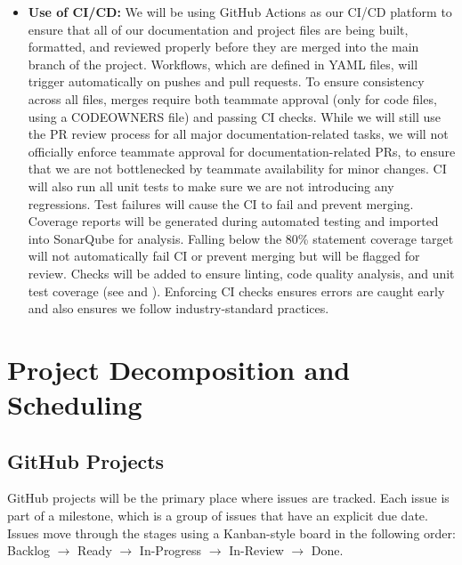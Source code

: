 \documentclass{article}
\begin{document}
\begin{itemize}
    \item \textbf{Use of CI/CD:} We will be using GitHub Actions as our CI/CD platform to ensure that all of our documentation and project files are being built,
          formatted, and reviewed properly before they are merged into the main branch of the project. Workflows, which are defined in
          YAML files, will trigger automatically on pushes and pull requests. To ensure consistency across
          all files, merges require both teammate approval (only for code files, using a CODEOWNERS file) and passing CI checks.
          While we will still use the PR review process for all major documentation-related tasks, we will not officially enforce teammate approval for documentation-related PRs, to ensure that we are not bottlenecked by teammate availability for minor changes.
          CI will also run all unit tests to make sure we are not introducing any regressions.
          Test failures will cause the CI to fail and prevent merging.
          Coverage reports will be generated during automated testing and imported into SonarQube for analysis.
          Falling below the 80\% statement coverage target will not automatically fail CI or prevent merging but will be flagged for review.
          Checks will be added to ensure linting, code quality analysis, and unit test coverage (see  and ).
          Enforcing CI checks ensures errors are caught early and also ensures we follow industry-standard practices.

\end{itemize}

\section{Project Decomposition and Scheduling}


\subsection*{GitHub Projects}

GitHub projects will be the primary place where issues are tracked. Each issue
is part of a milestone, which is a group of issues that have an explicit due
date. Issues move through the stages using a Kanban-style board in the
following order: Backlog $\rightarrow$ Ready $\rightarrow$ In-Progress
$\rightarrow$ In-Review $\rightarrow$ Done.
\end{document}
